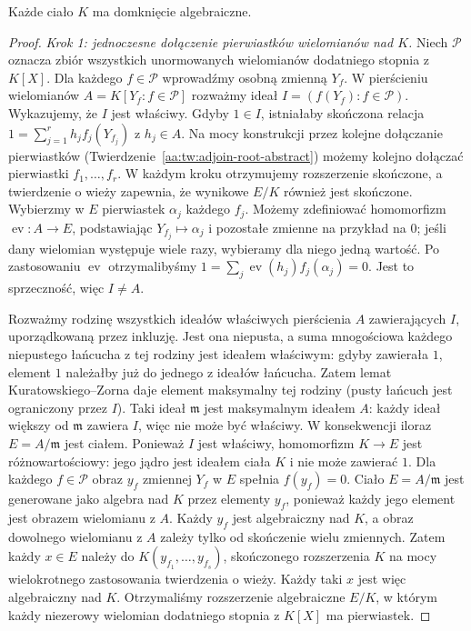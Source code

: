 \begin{twierdzenie}
\label{aa:tw:algebraic-closure-exists}
Każde ciało $K$ ma domknięcie algebraiczne.
\end{twierdzenie}
\begin{proof}
\emph{Krok 1: jednoczesne dołączenie pierwiastków wielomianów nad $K$.}
Niech $\mathcal P$ oznacza zbiór wszystkich unormowanych
wielomianów dodatniego stopnia z $K[X]$. Dla każdego
$f\in\mathcal P$ wprowadźmy osobną zmienną $Y_f$.
W pierścieniu wielomianów
$A=K[Y_f:f\in\mathcal P]$ rozważmy ideał
$I=(f(Y_f):f\in\mathcal P)$.
Wykazujemy, że $I$ jest właściwy.
Gdyby $1\in I$, istniałaby skończona relacja
$1=\sum_{j=1}^r h_jf_j(Y_{f_j})$ z $h_j\in A$.
Na mocy konstrukcji przez kolejne dołączanie
pierwiastków (Twierdzenie~\ref{aa:tw:adjoin-root-abstract})
możemy kolejno dołączać pierwiastki $f_1,\ldots,f_r$.
W każdym kroku otrzymujemy rozszerzenie skończone,
a twierdzenie o wieży zapewnia, że wynikowe $E/K$
również jest skończone. Wybierzmy w $E$ pierwiastek
$\alpha_j$ każdego $f_j$. Możemy zdefiniować homomorfizm
$\operatorname{ev}:A\to E$, podstawiając
$Y_{f_j}\mapsto\alpha_j$ i pozostałe zmienne
na przykład na $0$; jeśli dany wielomian występuje
wiele razy, wybieramy dla niego jedną wartość.
Po zastosowaniu $\operatorname{ev}$ otrzymalibyśmy
$1=\sum_j\operatorname{ev}(h_j)f_j(\alpha_j)=0$.
Jest to sprzeczność, więc $I\ne A$.

Rozważmy rodzinę wszystkich ideałów właściwych pierścienia $A$
zawierających $I$, uporządkowaną przez inkluzję. Jest ona
niepusta, a suma mnogościowa każdego niepustego łańcucha
z tej rodziny jest ideałem właściwym: gdyby zawierała $1$, element $1$
należałby już do jednego z ideałów łańcucha. Zatem
lemat Kuratowskiego--Zorna daje element maksymalny tej
rodziny (pusty łańcuch jest ograniczony przez $I$). Taki ideał $\mathfrak m$ jest maksymalnym ideałem
$A$: każdy ideał większy od $\mathfrak m$ zawiera $I$,
więc nie może być właściwy. W konsekwencji iloraz
$E=A/\mathfrak m$ jest ciałem.
Ponieważ $I$ jest właściwy, homomorfizm
$K\to E$ jest różnowartościowy: jego jądro jest
ideałem ciała $K$ i nie może zawierać $1$.
Dla każdego $f\in\mathcal P$ obraz $y_f$ zmiennej
$Y_f$ w $E$ spełnia $f(y_f)=0$.
Ciało $E=A/\mathfrak m$ jest generowane jako algebra nad $K$
przez elementy $y_f$, ponieważ każdy jego element
jest obrazem wielomianu z $A$. Każdy $y_f$ jest
algebraiczny nad $K$, a obraz dowolnego wielomianu
z $A$ zależy tylko od skończenie wielu zmiennych.
Zatem każdy $x\in E$ należy do
$K(y_{f_1},\ldots,y_{f_s})$, skończonego rozszerzenia
$K$ na mocy wielokrotnego zastosowania twierdzenia
o wieży. Każdy taki $x$ jest więc algebraiczny nad $K$.
Otrzymaliśmy rozszerzenie algebraiczne $E/K$, w którym
każdy niezerowy wielomian dodatniego stopnia z $K[X]$
ma pierwiastek.


\end{proof}
